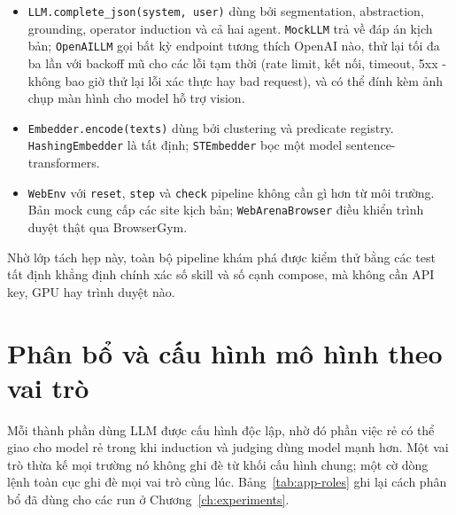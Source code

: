\begin{itemize}
  \item \texttt{LLM.complete\_json(system, user)} dùng bởi segmentation,
        abstraction, grounding, operator induction và cả hai agent.
        \texttt{MockLLM} trả về đáp án kịch bản; \texttt{OpenAILLM} gọi bất kỳ
        endpoint tương thích OpenAI nào, thử lại tối đa ba lần với backoff mũ
        cho các lỗi tạm thời (rate limit, kết nối, timeout, 5xx - không bao
        giờ thử lại lỗi xác thực hay bad request), và có thể đính kèm ảnh chụp
        màn hình cho model hỗ trợ vision.
  \item \texttt{Embedder.encode(texts)} dùng bởi clustering và predicate
        registry. \texttt{HashingEmbedder} là tất định; \texttt{STEmbedder}
        bọc một model sentence-transformers.
  \item \texttt{WebEnv} với \texttt{reset}, \texttt{step} và \texttt{check}
        pipeline không cần gì hơn từ môi trường. Bản mock cung cấp các site
        kịch bản; \texttt{WebArenaBrowser} điều khiển trình duyệt thật qua
        BrowserGym.
\end{itemize}

\noindent
Nhờ lớp tách hẹp này, toàn bộ pipeline khám phá được kiểm thử bằng các test
tất định khẳng định chính xác số skill và số cạnh compose, mà không cần API
key, GPU hay trình duyệt nào.

\section{Phân bổ và cấu hình mô hình theo vai trò}
\label{app:design-config}

Mỗi thành phần dùng LLM được cấu hình độc lập, nhờ đó phần việc rẻ có thể giao
cho model rẻ trong khi induction và judging dùng model mạnh hơn. Một vai trò
thừa kế mọi trường nó không ghi đè từ khối cấu hình chung; một cờ dòng lệnh
toàn cục ghi đè mọi vai trò cùng lúc. Bảng~\ref{tab:app-roles} ghi lại cách
phân bổ đã dùng cho các run ở Chương~\ref{ch:experiments}.

